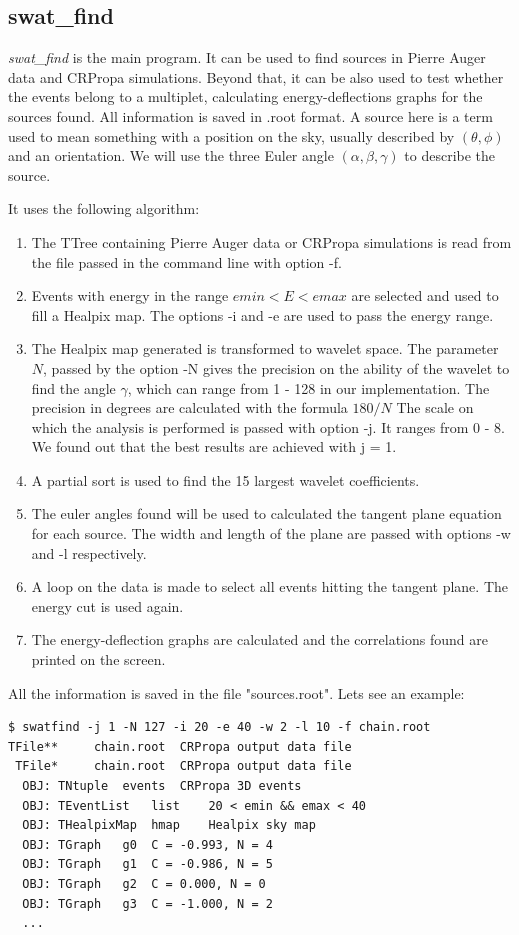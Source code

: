 \documentclass[12pt]{article}
\begin{document}
\subsection{swat\_find}
{\it swat\_find} is the main program. It can be used to find sources in Pierre
Auger data and CRPropa simulations. Beyond that, it can be also used to test
whether the events belong to a multiplet, calculating energy-deflections graphs
for the sources found. All information is saved in .root format. A source here
is a term used to mean something with a position on the sky, usually described
by $(\theta,\phi)$ and an orientation. We will use the three Euler angle
$(\alpha,\beta,\gamma)$ to describe the source. 

It uses the following algorithm:
\begin{enumerate}
\item The TTree containing Pierre Auger data or CRPropa simulations
is read from the file passed in the command line with option -f.
\item Events with energy in the range $emin < E < emax$ are selected and used
to fill a Healpix map.  The options -i and -e are used to pass the energy range.
\item The Healpix map generated is transformed to wavelet space. The parameter
$N$, passed by the option -N gives the precision on the ability of the wavelet
to find the angle $\gamma$, which can range from 1 - 128 in our implementation. 
The precision in degrees are calculated with the formula $180/N$ The scale on
which the analysis is performed is passed with option -j. It ranges from 0 - 8.
We found out that the best results are achieved with j = 1.
\item A partial sort is used to find the 15 largest wavelet coefficients.
\item The euler angles found will be used to calculated the tangent plane
equation for each source. The width and length of the plane are passed with
options -w and -l respectively.
\item A loop on the data is made to select all events hitting the tangent
plane. The energy cut is used again.
\item The energy-deflection graphs are calculated and the correlations found
are printed on the screen.
\end{enumerate}
All the information is saved in the file {\color{brown}"sources.root"}.  Lets see an example:

{\bf \color{brown}
\begin{lstlisting}
$ swatfind -j 1 -N 127 -i 20 -e 40 -w 2 -l 10 -f chain.root
TFile**		chain.root	CRPropa output data file
 TFile*		chain.root	CRPropa output data file
  OBJ: TNtuple	events	CRPropa 3D events
  OBJ: TEventList	list	20 < emin && emax < 40 
  OBJ: THealpixMap	hmap	Healpix sky map
  OBJ: TGraph	g0	C = -0.993, N = 4 
  OBJ: TGraph	g1	C = -0.986, N = 5
  OBJ: TGraph	g2	C = 0.000, N = 0
  OBJ: TGraph	g3	C = -1.000, N = 2
  ...
\end{lstlisting}
}
\end{document}
